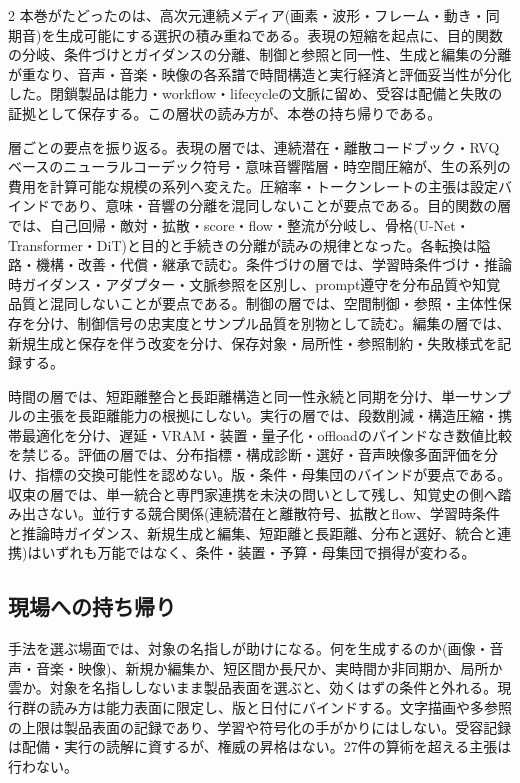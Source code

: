 \documentclass[lualatex,a4paper,10pt]{jlreq}
\begin{document}
\begin{multicols}{2}
\raggedcolumns
本巻がたどったのは、高次元連続メディア(画素・波形・フレーム・動き・同期音)を生成可能にする選択の積み重ねである。表現の短縮を起点に、目的関数の分岐、条件づけとガイダンスの分離、制御と参照と同一性、生成と編集の分離が重なり、音声・音楽・映像の各系譜で時間構造と実行経済と評価妥当性が分化した。閉鎖製品は能力・workflow・lifecycleの文脈に留め、受容は配備と失敗の証拠として保存する。この層状の読み方が、本巻の持ち帰りである。

層ごとの要点を振り返る。表現の層では、連続潜在・離散コードブック・RVQベースのニューラルコーデック符号・意味音響階層・時空間圧縮が、生の系列の費用を計算可能な規模の系列へ変えた。圧縮率・トークンレートの主張は設定バインドであり、意味・音響の分離を混同しないことが要点である\autocite{btd002}。目的関数の層では、自己回帰・敵対・拡散・score・flow・整流が分岐し、骨格(U-Net・Transformer・DiT)と目的と手続きの分離が読みの規律となった。各転換は隘路・機構・改善・代償・継承で読む\autocite{btd023}。条件づけの層では、学習時条件づけ・推論時ガイダンス・アダプター・文脈参照を区別し、prompt遵守を分布品質や知覚品質と混同しないことが要点である\autocite{btd032}。制御の層では、空間制御・参照・主体性保存を分け、制御信号の忠実度とサンプル品質を別物として読む\autocite{btd039}。編集の層では、新規生成と保存を伴う改変を分け、保存対象・局所性・参照制約・失敗様式を記録する\autocite{btd049}。

時間の層では、短距離整合と長距離構造と同一性永続と同期を分け、単一サンプルの主張を長距離能力の根拠にしない\autocite{btd058}。実行の層では、段数削減・構造圧縮・携帯最適化を分け、遅延・VRAM・装置・量子化・offloadのバインドなき数値比較を禁じる\autocite{btd066}。評価の層では、分布指標・構成診断・選好・音声映像多面評価を分け、指標の交換可能性を認めない。版・条件・母集団のバインドが要点である\autocite{btd075}。収束の層では、単一統合と専門家連携を未決の問いとして残し、知覚史の側へ踏み出さない\autocite{btd131}。並行する競合関係(連続潜在と離散符号、拡散とflow、学習時条件と推論時ガイダンス、新規生成と編集、短距離と長距離、分布と選好、統合と連携)はいずれも万能ではなく、条件・装置・予算・母集団で損得が変わる\autocite{btd078}\autocite{btd087}\autocite{btd096}。

\subsection{現場への持ち帰り}
手法を選ぶ場面では、対象の名指しが助けになる。何を生成するのか(画像・音声・音楽・映像)、新規か編集か、短区間か長尺か、実時間か非同期か、局所か雲か。対象を名指ししないまま製品表面を選ぶと、効くはずの条件と外れる。現行群の読み方は能力表面に限定し、版と日付にバインドする。文字描画や多参照の上限は製品表面の記録であり、学習や符号化の手がかりにはしない\autocite{btd101}。受容記録は配備・実行の読解に資するが、権威の昇格はない\autocite{btd139}。27件の算術を超える主張は行わない。


\end{multicols}
\end{document}
